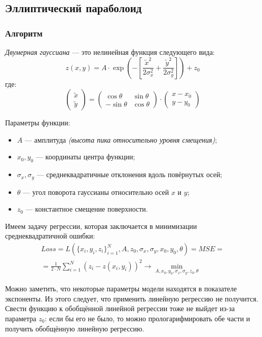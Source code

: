 \subsection{Эллиптический параболоид}

\subsubsection{Алгоритм}

\textit{Двумерная гауссиана} --- это нелинейная функция следующего вида:
\[
z(x, y) = A \cdot \exp \left( - \left[ \frac{\tilde{x}^2}{2\sigma_x^2} + \frac{\tilde{y}^2}{2\sigma_y^2} \right] \right) + z_0
\]
где:
\[
\begin{pmatrix}
\tilde{x} \\
\tilde{y}
\end{pmatrix}
=
\begin{pmatrix}
\cos\theta & \sin\theta \\
-\sin\theta & \cos\theta
\end{pmatrix}
\cdot
\begin{pmatrix}
x - x_0 \\
y - y_0
\end{pmatrix}
\]

Параметры функции:
\begin{itemize}
  \item $A$ --- амплитуда \textit{(высота пика относительно уровня смещения)};
  \item $x_0, y_0$ --- координаты центра функции;
  \item $\sigma_x, \sigma_y$ --- среднеквадратичные отклонения вдоль повёрнутых осей;
  \item $\theta$ --- угол поворота гауссианы относительно осей $x$ и $y$;
  \item $z_0$ --- константное смещение поверхности.
\end{itemize}

Имеем задачу регрессии, которая заключается в минимизации среднеквадратичной ошибки:
\[
\begin{gathered}
  Loss = L(\{x_i,y_i,z_i\}^N_{i=1},A,z_0,\sigma_x,\sigma_y,x_0,y_0,\theta) = MSE = \\
  =\frac{1}{2\cdot N} \sum_{i=1}^{N} (z_i - z(x_i,y_i))^2 \to \min_{A,x_0,y_0,\sigma_x,\sigma_y,z_0,\theta}
\end{gathered}
\]

Можно заметить, что некоторые параметры модели находятся в показателе экспоненты. Из этого следует, что применить линейную регрессию не получится. Свести функцию к обобщённой линейной регрессии тоже не выйдет из-за параметра \( z_0 \): если бы его не было, то можно прологарифмировать обе части и получить обобщённую линейную регрессию.


